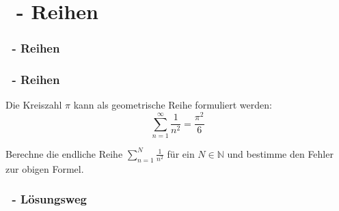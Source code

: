 \def\stitle{\theexercise\ - Reihen}
\section{\stitle}
\begin{frame}
  \frametitle{\stitle}%
\tableofcontents[current]
\end{frame}

\begin{frame}[t]%
    \frametitle{\stitle}

Die Kreiszahl $\pi$ kann als geometrische Reihe formuliert werden:
$$
\sum_{n=1}^\infty  \frac{1}{n^2} = \frac{\pi^2}{6}
$$

Berechne die endliche Reihe $\sum_{n=1}^N \frac{1}{n^2}$ für ein $N\in\mathbb{N}$ und bestimme den Fehler zur obigen Formel.

\pause

\end{frame}


\begin{frame}[fragile]%
 \frametitle{\theexercise\ - Lösungsweg}%

\end{frame}
